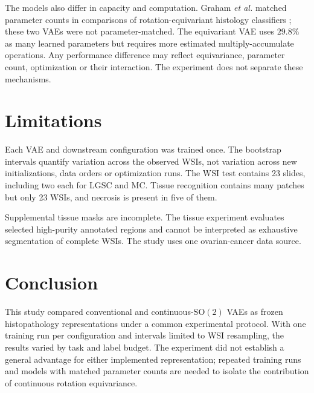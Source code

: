 \documentclass[conference,a4paper]{IEEEtran}
\newcommand{\SOtwo}{\mathrm{SO}(2)}
\begin{document}
The models also differ in capacity and computation. Graham \emph{et al.}
matched parameter counts in comparisons of rotation-equivariant histology
classifiers \cite{graham_dense_2020}; these two VAEs were not
parameter-matched. The equivariant VAE uses $29.8\%$ as many learned parameters
but requires more estimated multiply-accumulate operations. Any performance
difference may reflect equivariance, parameter count, optimization or their
interaction. The experiment does not separate these mechanisms.

\section{Limitations}

Each VAE and downstream configuration was trained once. The bootstrap
intervals quantify variation across the observed WSIs, not variation across
new initializations, data orders or optimization runs. The WSI test contains 23 slides, including two each for LGSC
and MC.
Tissue recognition contains many patches but only 23 WSIs, and
necrosis is present in five of them.

Supplemental tissue masks are incomplete. The tissue experiment evaluates
selected high-purity annotated regions and cannot be interpreted as exhaustive
segmentation of complete WSIs. The study uses one ovarian-cancer data source.

\section{Conclusion}

This study compared conventional and continuous-$\SOtwo$ VAEs as frozen
histopathology representations under a common experimental protocol. With one
training run per configuration and intervals limited to WSI resampling, the results varied by task and label budget. The experiment did not
establish a general advantage for either implemented representation; repeated
training runs and models with matched parameter counts are needed to isolate
the contribution of continuous rotation equivariance.



\end{document}
